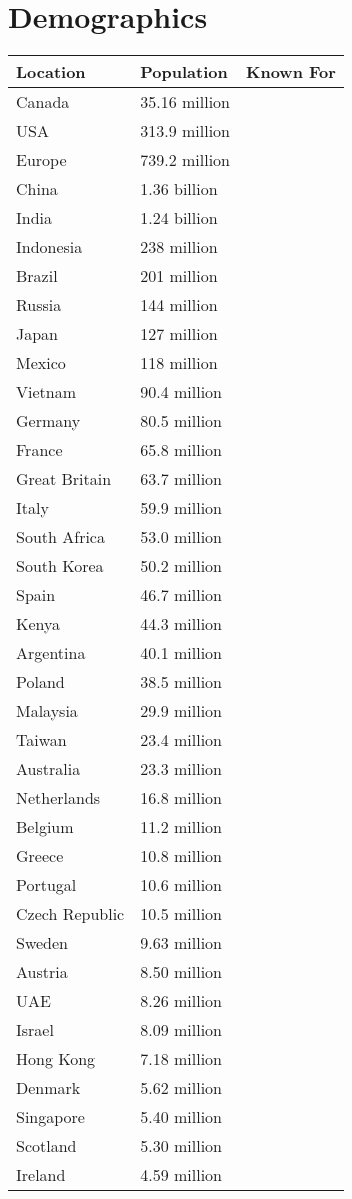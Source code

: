 \documentclass{article}
\begin{document}
\section{Demographics}
	\begin{longtabu} to 0.75\linewidth { X X X }
		Location & Population & Known For \\
		\hline
		Canada & 35.16 million & \\
		USA & 313.9 million & \\
		Europe & 739.2 million & \\
		China & 1.36 billion & \\
		India & 1.24 billion & \\
		Indonesia & 238 million & \\
		Brazil & 201 million & \\
		Russia & 144 million & \\
		Japan & 127 million & \\
		Mexico & 118 million & \\
		Vietnam & 90.4 million & \\
		Germany & 80.5 million & \\
		France & 65.8 million & \\
		Great Britain & 63.7 million & \\
		Italy & 59.9 million & \\
		South Africa & 53.0 million & \\
		South Korea & 50.2 million & \\
		Spain & 46.7 million & \\
		Kenya & 44.3 million & \\
		Argentina & 40.1 million & \\
		Poland & 38.5 million & \\
		Malaysia & 29.9 million & \\
		Taiwan & 23.4 million & \\
		Australia & 23.3 million & \\
		Netherlands & 16.8 million & \\
		Belgium & 11.2 million & \\
		Greece & 10.8 million & \\
		Portugal & 10.6 million & \\
		Czech Republic & 10.5 million & \\
		Sweden & 9.63 million & \\
		Austria & 8.50 million & \\
		UAE & 8.26 million & \\
		Israel & 8.09 million & \\
		Hong Kong & 7.18 million & \\
		Denmark & 5.62 million & \\
		Singapore & 5.40 million & \\
		Scotland & 5.30 million & \\
		Ireland & 4.59 million & \\
	\end{longtabu}
\end{document}
